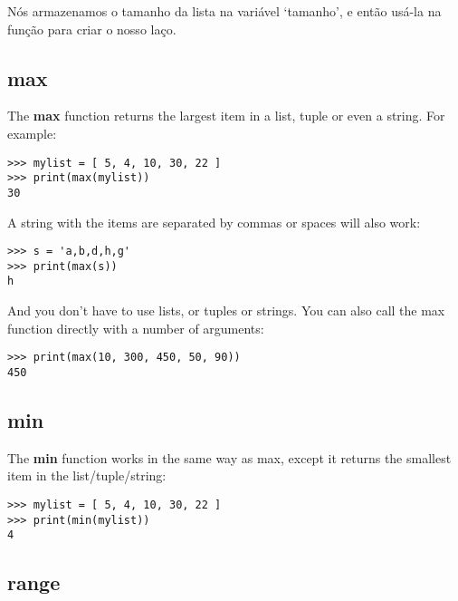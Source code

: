 \noindent
Nós armazenamos o tamanho da lista na variável `tamanho', e então usá-la na função  para criar o nosso laço.

\subsection*{max}

The \textbf{max} function returns the largest item in a list, tuple or even a string. For example:

\begin{listing}
\begin{verbatim}
>>> mylist = [ 5, 4, 10, 30, 22 ]
>>> print(max(mylist))
30
\end{verbatim}
\end{listing}

\noindent
A string with the items are separated by commas or spaces will also work:

\begin{listing}
\begin{verbatim}
>>> s = 'a,b,d,h,g'
>>> print(max(s))
h
\end{verbatim}
\end{listing}

\noindent
And you don't have to use lists, or tuples or strings. You can also call the max function directly with a number of arguments:

\begin{listing}
\begin{verbatim}
>>> print(max(10, 300, 450, 50, 90))
450
\end{verbatim}
\end{listing}

\subsection*{min}

The \textbf{min} function works in the same way as max, except it returns the smallest item in the list/tuple/string:

\begin{listing}
\begin{verbatim}
>>> mylist = [ 5, 4, 10, 30, 22 ]
>>> print(min(mylist))
4
\end{verbatim}
\end{listing}

\subsection*{range}

